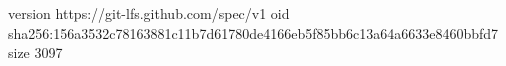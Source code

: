 version https://git-lfs.github.com/spec/v1
oid sha256:156a3532c78163881c11b7d61780de4166eb5f85bb6c13a64a6633e8460bbfd7
size 3097
